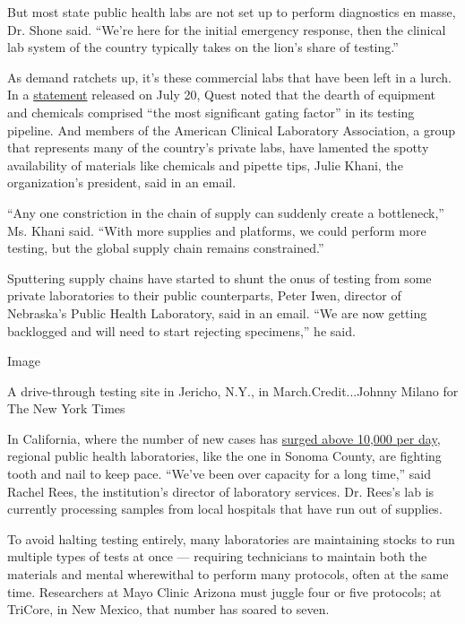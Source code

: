 But most state public health labs are not set up to perform diagnostics
en masse, Dr. Shone said. ``We're here for the initial emergency
response, then the clinical lab system of the country typically takes on
the lion's share of testing.''

As demand ratchets up, it's these commercial labs that have been left in
a lurch. In a
\href{https://newsroom.questdiagnostics.com/COVIDTestingUpdates}{statement}
released on July 20, Quest noted that the dearth of equipment and
chemicals comprised ``the most significant gating factor'' in its
testing pipeline. And members of the American Clinical Laboratory
Association, a group that represents many of the country's private labs,
have lamented the spotty availability of materials like chemicals and
pipette tips, Julie Khani, the organization's president, said in an
email.

``Any one constriction in the chain of supply can suddenly create a
bottleneck,'' Ms. Khani said. ``With more supplies and platforms, we
could perform more testing, but the global supply chain remains
constrained.''

Sputtering supply chains have started to shunt the onus of testing from
some private laboratories to their public counterparts, Peter Iwen,
director of Nebraska's Public Health Laboratory, said in an email. ``We
are now getting backlogged and will need to start rejecting specimens,''
he said.

Image

A drive-through testing site in Jericho, N.Y., in March.Credit...Johnny
Milano for The New York Times

In California, where the number of new cases has
\href{https://www.nytimes3xbfgragh.onion/interactive/2020/us/california-coronavirus-cases.html}{surged
above 10,000 per day}, regional public health laboratories, like the one
in Sonoma County, are fighting tooth and nail to keep pace. ``We've been
over capacity for a long time,'' said Rachel Rees, the institution's
director of laboratory services. Dr. Rees's lab is currently processing
samples from local hospitals that have run out of supplies.

To avoid halting testing entirely, many laboratories are maintaining
stocks to run multiple types of tests at once --- requiring technicians
to maintain both the materials and mental wherewithal to perform many
protocols, often at the same time. Researchers at Mayo Clinic Arizona
must juggle four or five protocols; at TriCore, in New Mexico, that
number has soared to seven.

